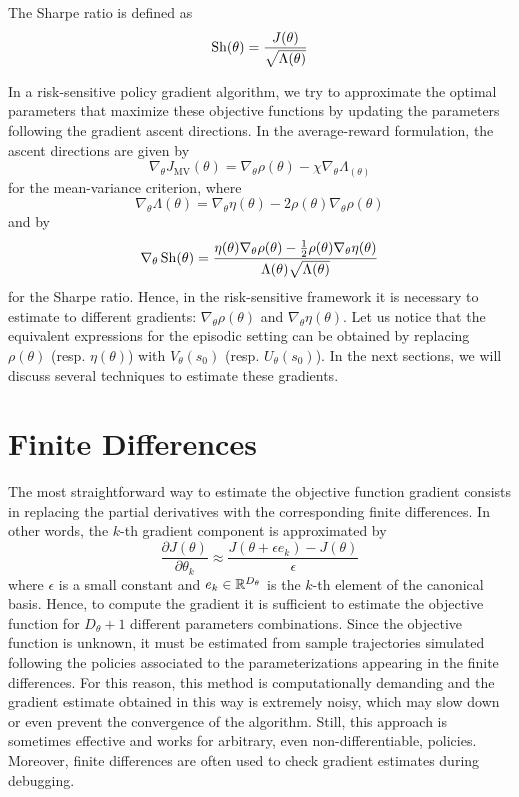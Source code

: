 \begin{definition}
	The Sharpe ratio is defined as 
	\begin{equation}
		\operatorname*{Sh}(\theta) = \frac{J(\theta)}{\sqrt{\Lambda(\theta)}}
	\end{equation}
\end{definition} 
In a risk-sensitive policy gradient algorithm, we try to approximate the optimal parameters that maximize these objective functions by updating the parameters following the gradient ascent directions. In the average-reward formulation, the ascent directions are given by 
\begin{equation}
	\nabla_\theta J_{\text{MV}}(\theta) = \nabla_\theta \rho(\theta) - \chi \nabla_\theta \Lambda_(\theta)
\end{equation}
for the mean-variance criterion, where 
\begin{equation}
	\nabla_\theta \Lambda(\theta) =	\nabla_\theta \eta(\theta) - 2 \rho(\theta) \nabla_\theta \rho(\theta)
\end{equation} 
and by 
\begin{equation} 
	\nabla_\theta \operatorname*{Sh}(\theta) = \frac{\eta(\theta) \nabla_\theta \rho(\theta) - \frac{1}{2} \rho(\theta) \nabla_\theta \eta(\theta)}{\Lambda(\theta) \sqrt{\Lambda(\theta)}}
\end{equation}
for the Sharpe ratio. Hence, in the risk-sensitive framework it is necessary to estimate to different gradients: $\nabla_\theta \rho(\theta)$ and $\nabla_\theta \eta(\theta)$. Let us notice that the equivalent expressions for the episodic setting can be obtained by replacing $\rho(\theta)$ (resp. $\eta(\theta)$) with $V_\theta(s_0)$ (resp. $U_\theta(s_0)$). In the next sections, we will discuss several techniques to estimate these gradients.

\section{Finite Differences}
The most straightforward way to estimate the objective function gradient consists in replacing the partial derivatives with the corresponding finite differences. In other words, the $k$-th gradient component is approximated by
\begin{equation}
	\frac{\partial J(\theta)}{\partial\theta_k} \approx \frac{J(\theta + \epsilon e_k) - J(\theta)}{\epsilon}
\end{equation}
where $\epsilon$ is a small constant and $e_k \in \mathbb{R}^{D_\theta}$ is the $k$-th element of the canonical basis. Hence, to compute the gradient it is sufficient to estimate the objective function for $D_\theta + 1$ different parameters combinations. Since the objective function is unknown, it must be estimated from sample trajectories simulated following the policies associated to the parameterizations appearing in the finite differences. For this reason, this method is computationally demanding and the gradient estimate obtained in this way is extremely noisy, which may slow down or even prevent the convergence of the algorithm. Still, this approach is sometimes effective and works for arbitrary, even non-differentiable, policies. Moreover, finite differences are often used to check gradient estimates during debugging.

